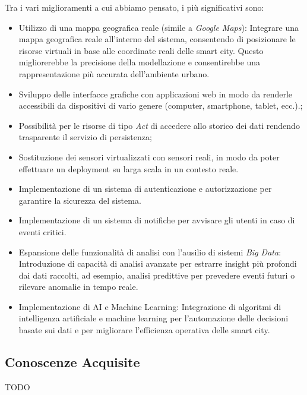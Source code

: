 \documentclass{scrartcl}
\begin{document}
Tra i vari miglioramenti a cui abbiamo pensato, i più significativi sono:
\begin{itemize}
    \item Utilizzo di una mappa geografica reale (simile a \textit{Google Maps}): Integrare una mappa geografica reale all'interno del sistema, consentendo di posizionare le risorse virtuali in base alle coordinate reali delle smart city. Questo migliorerebbe la precisione della modellazione e consentirebbe una rappresentazione più accurata dell'ambiente urbano.
    \item Sviluppo delle interfacce grafiche con applicazioni web in modo da renderle accessibili da dispositivi di vario genere (computer, smartphone, tablet, ecc.).;
    \item Possibilità per le risorse di tipo \textit{Act} di accedere allo storico dei dati rendendo trasparente il servizio di persistenza;
    \item Sostituzione dei sensori virtualizzati con sensori reali, in modo da poter effettuare un deployment su larga scala in un contesto reale.
    \item Implementazione di un sistema di autenticazione e autorizzazione per garantire la sicurezza del sistema.
    \item Implementazione di un sistema di notifiche per avvisare gli utenti in caso di eventi critici.
    \item Espansione delle funzionalità di analisi con l'ausilio di sistemi \textit{Big Data}: Introduzione di capacità di analisi avanzate per estrarre insight più profondi dai dati raccolti, ad esempio, analisi predittive per prevedere eventi futuri o rilevare anomalie in tempo reale.
    \item Implementazione di AI e Machine Learning: Integrazione di algoritmi di intelligenza artificiale e machine learning per l'automazione delle decisioni basate sui dati e per migliorare l'efficienza operativa delle smart city.
\end{itemize}

\subsection{Conoscenze Acquisite}

TODO

\nocite{*} %


\end{document}
